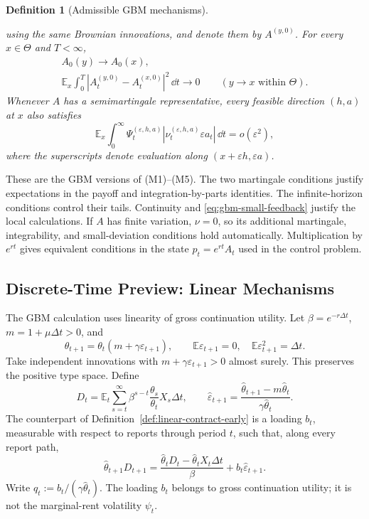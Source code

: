 \documentclass[12pt]{article}
\newtheorem{definition}{Definition}
\newcommand{\E}{\mathbb{E}}
\newcommand{\hth}{\hat\theta}
\begin{document}
\begin{definition}[Admissible GBM mechanisms]
\begin{enumerate}[label=\textnormal{(GM\arabic*)},leftmargin=3.3em]
using the same Brownian innovations, and denote them by
\(A^{(y,0)}\). For every \(x\in\Theta\) and \(T<\infty\),
\[
\begin{gathered}
  A_0(y)\longrightarrow A_0(x),
  \\
  \E_x\int_0^T|A_t^{(y,0)}-A_t^{(x,0)}|^2\,\dd t
  \longrightarrow0\qquad(y\to x\text{ within }\Theta).
\end{gathered}
\]
Whenever \(A\) has a semimartingale representative, every feasible
direction \((h,a)\) at \(x\) also satisfies
\begin{equation}\label{eq:gbm-small-feedback}
  \E_x\int_0^\infty
    \Psi_t^{(\varepsilon,h,a)}
    |\nu_t^{(\varepsilon,h,a)}\varepsilon a_t|\,\dd t
  =o(\varepsilon^2),
\end{equation}
where the superscripts denote evaluation along
\((x+\varepsilon h,\varepsilon a)\).
\end{enumerate}
\end{definition}

These are the GBM versions of (M1)--(M5). The two martingale conditions
justify expectations in the payoff and integration-by-parts identities.
The infinite-horizon conditions control their tails. Continuity and
\eqref{eq:gbm-small-feedback} justify the local calculations. If \(A\)
has finite variation, \(\nu=0\), so its additional martingale,
integrability, and small-deviation conditions hold automatically.
Multiplication by \(e^{rt}\) gives equivalent conditions in the state
\(p_t=e^{rt}A_t\) used in the control problem.

\subsection{Discrete-Time Preview: Linear Mechanisms}
\label{app:gbm-discrete}

The GBM calculation uses linearity of gross continuation utility.
Let \(\beta=e^{-r\Delta t}\), \(m=1+\mu\Delta t>0\), and
\[
  \theta_{t+1}=\theta_t(m+\gamma\varepsilon_{t+1}),
  \qquad \E\varepsilon_{t+1}=0,
  \quad \E\varepsilon_{t+1}^2=\Delta t.
\]
Take independent innovations with \(m+\gamma\varepsilon_{t+1}>0\)
almost surely. This preserves the positive type space. Define
\[
  D_t=\E_t\sum_{s=t}^\infty
    \beta^{s-t}\frac{\theta_s}{\theta_t}X_s\Delta t,
  \qquad
  \hat\varepsilon_{t+1}
    =\frac{\hth_{t+1}-m\hth_t}{\gamma\hth_t}.
\]
The counterpart of Definition~\ref{def:linear-contract-early} is a
loading \(b_t\), measurable with respect to reports through period
\(t\), such that, along every report path,
\begin{equation}\label{eq:gbm-discrete-linear}
  \hth_{t+1}D_{t+1}
  =\frac{\hth_tD_t-\hth_tX_t\Delta t}{\beta}
    +b_t\hat\varepsilon_{t+1}.
\end{equation}
Write \(q_t:=b_t/(\gamma\hth_t)\). The loading \(b_t\) belongs to
gross continuation utility; it is not the marginal-rent volatility
\(\psi_t\).
\end{document}

